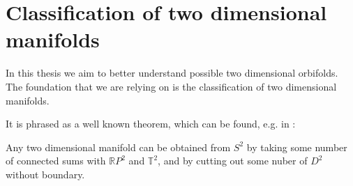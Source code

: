 


\section{Classification of two dimensional manifolds}\label{2 dim manifolds}
In this thesis we aim to better understand possible two dimensional orbifolds. 
The foundation that we are relying on is the classification of two dimensional manifolds. 

It is phrased as a well known theorem, which can be found, e.g. in \cite{Conway2016}:
\begin{theorem}
Any two dimensional manifold can be obtained from $S^2$ by taking some number of 
connected sums with $\mathbb{R}P^2$ and $\mathbb{T}^2$, and by cutting out 
some nuber of $D^2$ without boundary.
\end{theorem}


